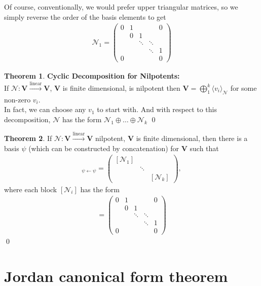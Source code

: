 \documentclass{book}
\theoremstyle{definition}
\newtheorem{thm}{Theorem}[section]
\newcommand{\V}{\mathbf{V}}
\newcommand{\lin}{\overset{\text{linear}}{\longrightarrow}}
\begin{document}
Of course, conventionally, we would prefer upper triangular matrices, so we simply reverse the order of the basis elements to get 
\begin{align*}
\mathcal{N}_1 = \begin{pmatrix}
0 & 1 &  && 0\\
  & 0 & 1 && \\
 & & \ddots& \ddots & \\
&  & &\ddots&1\\
0 &  &  && 0
\end{pmatrix}
\end{align*}

\begin{thm} \textbf{Cyclic Decomposition for Nilpotents:} \\
	If $\mathcal{N} : \V \lin \V$, $\V$ is finite dimensional, is nilpotent then $\V = \bigoplus^k_{1} \langle v_i \rangle_\mathcal{N}$ for some non-zero $v_i$.\\
	
	In fact, we can choose any $v_1$ to start with. And with respect to this decomposition, $\mathcal{N}$ has the form $\mathcal{N}_1 \oplus \dots \oplus \mathcal{N}_k$ \qed
\end{thm}


\begin{thm}
	If $\mathcal{N}: \V \lin \V$ nilpotent, $\V$ is finite dimensional, then there is a basis $\psi$ (which can be constructed by concatenation) for $\V$ such that 
	\begin{align*}
	[\mathcal{N}]_{\psi \leftarrow \psi} = \begin{pmatrix}
	[\mathcal{N}_1] & & \\
	& \ddots &\\
	& & [\mathcal{N}_k]
	\end{pmatrix} ,
	\end{align*}
	where each block $[\mathcal{N}_i]$ has the form
	\begin{align*}
	[\mathcal{N}_i] = \begin{pmatrix}
	0 & 1 &  && 0\\
	& 0 & 1 && \\
	& & \ddots& \ddots & \\
	&  & &\ddots&1\\
	0 &  &  && 0
	\end{pmatrix}
	\end{align*}\qed
\end{thm}


\section{Jordan canonical form theorem}
\end{document}
